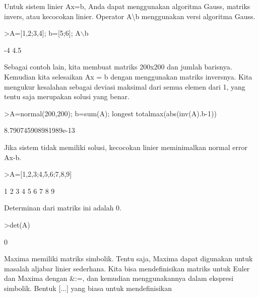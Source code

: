 \documentclass[a4paper,10pt]{article}
\begin{document}
\begin{eulernotebook}
\begin{eulercomment}
Untuk sistem linier Ax=b, Anda dapat menggunakan algoritma Gauss,
matriks invers, atau kecocokan linier. Operator A\textbackslash{}b menggunakan versi
algoritma Gauss.
\end{eulercomment}
\begin{eulerprompt}
>A=[1,2;3,4]; b=[5;6]; A\(\backslash\)b
\end{eulerprompt}
\begin{euleroutput}
             -4 
            4.5 
\end{euleroutput}
\begin{eulercomment}
Sebagai contoh lain, kita membuat matriks 200x200 dan jumlah barisnya.
Kemudian kita selesaikan Ax = b dengan menggunakan matriks inversnya.
Kita mengukur kesalahan sebagai deviasi maksimal dari semua elemen
dari 1, yang tentu saja merupakan solusi yang benar.
\end{eulercomment}
\begin{eulerprompt}
>A=normal(200,200); b=sum(A); longest totalmax(abs(inv(A).b-1))
\end{eulerprompt}
\begin{euleroutput}
    8.790745908981989e-13 
\end{euleroutput}
\begin{eulercomment}
Jika sistem tidak memiliki solusi, kecocokan linier meminimalkan
normal error Ax-b.
\end{eulercomment}
\begin{eulerprompt}
>A=[1,2,3;4,5,6;7,8,9]
\end{eulerprompt}
\begin{euleroutput}
              1             2             3 
              4             5             6 
              7             8             9 
\end{euleroutput}
\begin{eulercomment}
Determinan dari matriks ini adalah 0.
\end{eulercomment}
\begin{eulerprompt}
>det(A)
\end{eulerprompt}
\begin{euleroutput}
  0
\end{euleroutput}
\begin{eulercomment}
Maxima memiliki matriks simbolik. Tentu saja, Maxima dapat digunakan
untuk masalah aljabar linier sederhana. Kita bisa mendefinisikan
matriks untuk Euler dan Maxima dengan \&:=, dan kemudian menggunakannya
dalam ekspresi simbolik. Bentuk [...] yang biasa untuk mendefinisikan

\end{eulercomment}
\end{eulernotebook}
\end{document}
